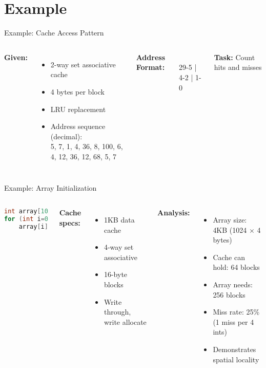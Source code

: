 \documentclass[aspectratio=169,12pt]{beamer}
\begin{document}
\section{Example}
\begin{frame}{Example: Cache Access Pattern}
\begin{columns}
\textbf{Given:}
\begin{itemize}
    \item 2-way set associative cache
    \item 4 bytes per block
    \item LRU replacement
    \item Address sequence (decimal):\\
    5, 7, 1, 4, 36, 8, 100, 6, 4, 12, 36, 12, 68, 5, 7
\end{itemize}

\textbf{Address Format:}
\begin{tcolorbox}\\
29-5 | 4-2 | 1-0
\end{tcolorbox}

\textbf{Task:} Count hits and misses
\end{columns}
\end{frame}

\begin{frame}[fragile]{Example: Array Initialization}
\begin{columns}
\begin{lstlisting}[language=C, basicstyle=\footnotesize\ttfamily, frame=single, backgroundcolor=\color{gray!10}]
int array[1024];
for (int i=0; i<1024; i++)
    array[i] = 0;
\end{lstlisting}

\textbf{Cache specs:}
\begin{itemize}
    \item 1KB data cache
    \item 4-way set associative
    \item 16-byte blocks
    \item Write through, write allocate
\end{itemize}

\textbf{Analysis:}
\begin{itemize}
    \item Array size: 4KB (1024 $\times$ 4 bytes)
    \item Cache can hold: 64 blocks
    \item Array needs: 256 blocks
    \item Miss rate: 25\% (1 miss per 4 ints)
    \item Demonstrates spatial locality
\end{itemize}
\end{columns}
\end{frame}
\end{document}
